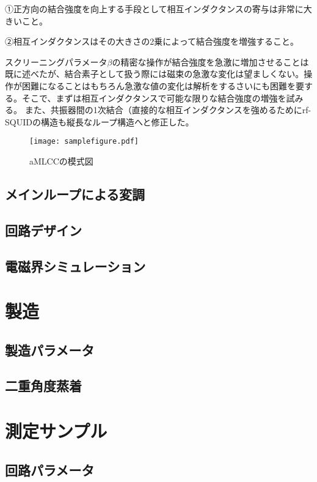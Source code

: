         ①正方向の結合強度を向上する手段として相互インダクタンスの寄与は非常に大きいこと。
        
        ②相互インダクタンスはその大きさの2乗によって結合強度を増強すること。
        
        スクリーニングパラメータ$\beta$の精密な操作が結合強度を急激に増加させることは既に述べたが、結合素子として扱う際には磁束の急激な変化は望ましくない。操作が困難になることはもちろん急激な値の変化は解析をするさいにも困難を要する。そこで、まずは相互インダクタンスで可能な限りな結合強度の増強を試みる。
        また、共振器間の1次結合（直接的な相互インダクタンスを強めるためにrf-SQUIDの構造も縦長なループ構造へと修正した。
        \begin{figure}[H]
            \centering
            \texttt{[image: samplefigure.pdf]}
            \caption{aMLCCの模式図}
        \end{figure}
    \subsection{メインループによる変調}
    

    \subsection{回路デザイン}

    \subsection{電磁界シミュレーション}
    

\section{製造}

    \subsection{製造パラメータ}

    \subsection{二重角度蒸着}

\section{測定サンプル}

    \subsection{回路パラメータ}
